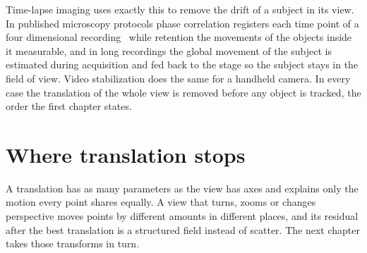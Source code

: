 Time-lapse imaging uses exactly this to remove the drift of a subject in its view. In published
microscopy protocols phase correlation registers each time point of a four dimensional recording~\cite{src:PMC4166950}
while retention the movements of the objects inside it measurable, and in long recordings the global
movement of the subject is estimated during acquisition and fed back to the stage so the subject
stays in the field of view. Video stabilization does the same for a handheld camera. In every case
the translation of the whole view is removed before any object is tracked, the order the
first chapter states.

\section{Where translation stops}

A translation has as many parameters as the view has axes and explains only the motion every point
shares equally. A view that turns, zooms or changes perspective moves points by different amounts
in different places, and its residual after the best translation is a structured field instead of
scatter. The next chapter takes those transforms in turn.
